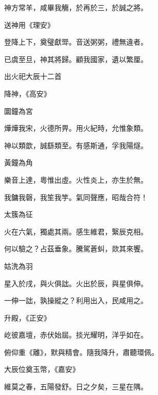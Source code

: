 \begin{pinyinscope}
 神方常羊，咸畢我觴，於再於三，於誠之將。



 送神用《理安》



 登降上下，奠璧獻斝。音送粥粥，禮無違者。



 已虞至旦，神其將歸。顧我國家，遺以繁厘。



 出火祀大辰十二首



 降神，《高安》



 圜鐘為宮



 燁燁我宋，火德所畀。用火紀時，允惟象類。



 神以類歆，誠繇類至。有感斯通，孚我陽燧。



 黃鐘為角



 樂音上達，粵惟出虛。火性炎上，亦生於無。



 我鏞我磬，我笙我竽。氣同聲應，昭哉合符！



 太簇為征



 火在六氣，獨處其兩。感生維君，繄辰克相。



 何以驗之？占茲垂象。騰駕蒼虯，欻其來饗。



 姑洗為羽



 星入於戌，與火俱詘。火出於辰，與星俱伸。



 一伸一詘，孰操縱之？利用出入，民咸用之。



 升殿，《正安》



 屹彼嘉壇，赤伏始屆。掞光耀明，洋乎如在。



 俯仰重《離》，默與精會。隨我降升，肅聽環佩。



 大辰位奠玉幣，《嘉安》



 維莫之春，五陽發舒。日之夕矣，三星在隅。




\end{pinyinscope}
